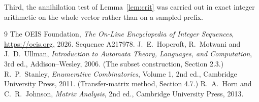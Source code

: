 \documentclass[11pt,a4paper]{article}
\theoremstyle{plain}
\theoremstyle{definition}
\begin{document}
Third, the annihilation test of Lemma~\ref{lem:crit} was carried out in exact integer
arithmetic on the whole vector rather than on a sampled prefix.

\begin{thebibliography}{9}
 The OEIS Foundation, \emph{The On-Line Encyclopedia of Integer
Sequences}, \url{https://oeis.org}, 2026. Sequence A217978.
 J.~E.~Hopcroft, R.~Motwani and J.~D.~Ullman, \emph{Introduction to Automata
Theory, Languages, and Computation}, 3rd ed., Addison--Wesley, 2006. (The subset
construction, Section 2.3.)
 R.~P.~Stanley, \emph{Enumerative Combinatorics}, Volume 1, 2nd ed.,
Cambridge University Press, 2011. (Transfer-matrix method, Section 4.7.)
 R.~A.~Horn and C.~R.~Johnson, \emph{Matrix Analysis}, 2nd ed., Cambridge
University Press, 2013.
\end{thebibliography}
\end{document}
